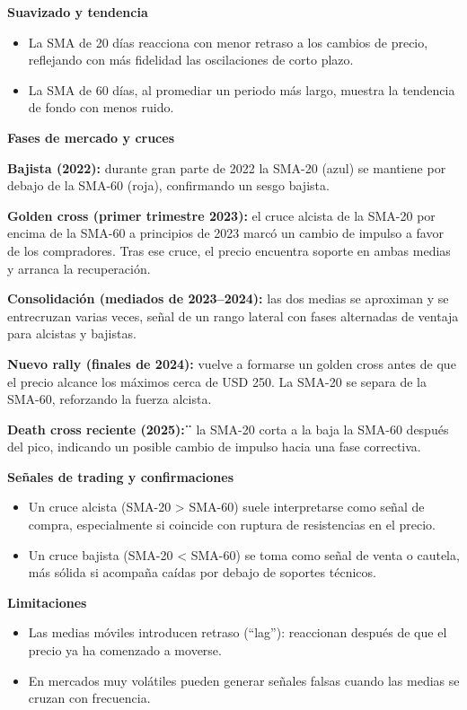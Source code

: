 \documentclass[
  11pt,
]{book}
\begin{document}
\textbf{Suavizado y tendencia}

\begin{itemize}
\item
  La SMA de 20 días reacciona con menor retraso a los cambios de precio, reflejando con más fidelidad las oscilaciones de corto plazo.
\item
  La SMA de 60 días, al promediar un periodo más largo, muestra la tendencia de fondo con menos ruido.
\end{itemize}

\textbf{Fases de mercado y cruces}

\textbf{Bajista (2022):} durante gran parte de 2022 la SMA-20 (azul) se mantiene por debajo de la SMA-60 (roja), confirmando un sesgo bajista.

\textbf{Golden cross (primer trimestre 2023):} el cruce alcista de la SMA-20 por encima de la SMA-60 a principios de 2023 marcó un cambio de impulso a favor de los compradores. Tras ese cruce, el precio encuentra soporte en ambas medias y arranca la recuperación.

\textbf{Consolidación (mediados de 2023--2024):} las dos medias se aproximan y se entrecruzan varias veces, señal de un rango lateral con fases alternadas de ventaja para alcistas y bajistas.

\textbf{Nuevo rally (finales de 2024):} vuelve a formarse un golden cross antes de que el precio alcance los máximos cerca de USD 250. La SMA-20 se separa de la SMA-60, reforzando la fuerza alcista.

\textbf{Death cross reciente (2025):¨} la SMA-20 corta a la baja la SMA-60 después del pico, indicando un posible cambio de impulso hacia una fase correctiva.

\textbf{Señales de trading y confirmaciones}

\begin{itemize}
\item
  Un cruce alcista (SMA-20 \textgreater{} SMA-60) suele interpretarse como señal de compra, especialmente si coincide con ruptura de resistencias en el precio.
\item
  Un cruce bajista (SMA-20 \textless{} SMA-60) se toma como señal de venta o cautela, más sólida si acompaña caídas por debajo de soportes técnicos.
\end{itemize}

\textbf{Limitaciones}

\begin{itemize}
\item
  Las medias móviles introducen retraso (``lag''): reaccionan después de que el precio ya ha comenzado a moverse.
\item
  En mercados muy volátiles pueden generar señales falsas cuando las medias se cruzan con frecuencia.
\end{itemize}
\end{document}

